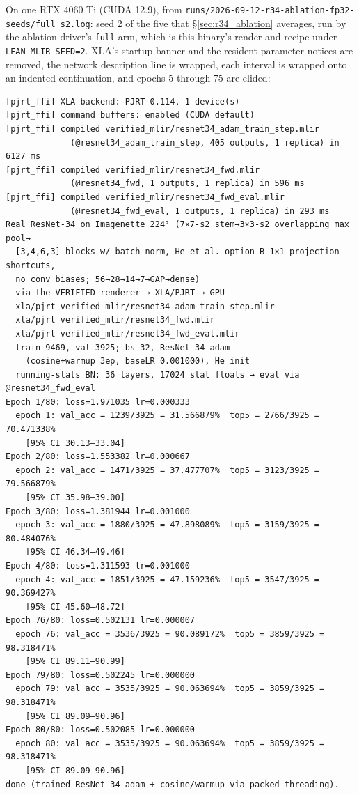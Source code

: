 On one RTX 4060 Ti (CUDA 12.9), from
\texttt{runs/2026-09-12-r34-ablation-fp32-seeds/full\_s2.log}: seed 2 of the
five that \S\ref{sec:r34_ablation} averages, run by the ablation driver's
\texttt{full} arm, which is this binary's render and recipe under
\texttt{LEAN\_MLIR\_SEED=2}. XLA's startup banner and the resident-parameter
notices are removed, the network description line is wrapped, each interval is
wrapped onto an indented continuation, and epochs 5 through 75 are elided:

\begin{verbatim}
[pjrt_ffi] XLA backend: PJRT 0.114, 1 device(s)
[pjrt_ffi] command buffers: enabled (CUDA default)
[pjrt_ffi] compiled verified_mlir/resnet34_adam_train_step.mlir
             (@resnet34_adam_train_step, 405 outputs, 1 replica) in 6127 ms
[pjrt_ffi] compiled verified_mlir/resnet34_fwd.mlir
             (@resnet34_fwd, 1 outputs, 1 replica) in 596 ms
[pjrt_ffi] compiled verified_mlir/resnet34_fwd_eval.mlir
             (@resnet34_fwd_eval, 1 outputs, 1 replica) in 293 ms
Real ResNet-34 on Imagenette 224² (7×7-s2 stem→3×3-s2 overlapping max pool→
  [3,4,6,3] blocks w/ batch-norm, He et al. option-B 1×1 projection shortcuts,
  no conv biases; 56→28→14→7→GAP→dense)
  via the VERIFIED renderer → XLA/PJRT → GPU
  xla/pjrt verified_mlir/resnet34_adam_train_step.mlir
  xla/pjrt verified_mlir/resnet34_fwd.mlir
  xla/pjrt verified_mlir/resnet34_fwd_eval.mlir
  train 9469, val 3925; bs 32, ResNet-34 adam
    (cosine+warmup 3ep, baseLR 0.001000), He init
  running-stats BN: 36 layers, 17024 stat floats → eval via @resnet34_fwd_eval
Epoch 1/80: loss=1.971035 lr=0.000333
  epoch 1: val_acc = 1239/3925 = 31.566879%  top5 = 2766/3925 = 70.471338%
    [95% CI 30.13–33.04]
Epoch 2/80: loss=1.553382 lr=0.000667
  epoch 2: val_acc = 1471/3925 = 37.477707%  top5 = 3123/3925 = 79.566879%
    [95% CI 35.98–39.00]
Epoch 3/80: loss=1.381944 lr=0.001000
  epoch 3: val_acc = 1880/3925 = 47.898089%  top5 = 3159/3925 = 80.484076%
    [95% CI 46.34–49.46]
Epoch 4/80: loss=1.311593 lr=0.001000
  epoch 4: val_acc = 1851/3925 = 47.159236%  top5 = 3547/3925 = 90.369427%
    [95% CI 45.60–48.72]
Epoch 76/80: loss=0.502131 lr=0.000007
  epoch 76: val_acc = 3536/3925 = 90.089172%  top5 = 3859/3925 = 98.318471%
    [95% CI 89.11–90.99]
Epoch 79/80: loss=0.502245 lr=0.000000
  epoch 79: val_acc = 3535/3925 = 90.063694%  top5 = 3859/3925 = 98.318471%
    [95% CI 89.09–90.96]
Epoch 80/80: loss=0.502085 lr=0.000000
  epoch 80: val_acc = 3535/3925 = 90.063694%  top5 = 3859/3925 = 98.318471%
    [95% CI 89.09–90.96]
done (trained ResNet-34 adam + cosine/warmup via packed threading).
\end{verbatim}

